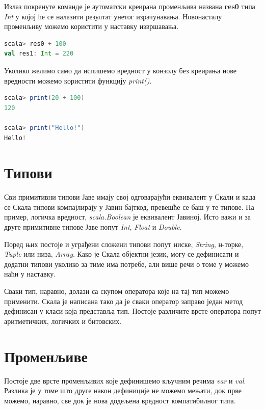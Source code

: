\documentclass[12pt,oneside]{memoir}
\begin{document}
Излаз покренуте команде је аутоматски креирана променљива названа \textbf{res0} типа \textit{Int} у којој ће се налазити резултат унетог израчунавања. Новонасталу променљиву можемо користити у наставку извршавања. \cite{scala_prog}

\begin{lstlisting}[language=Scala]
scala> res0 + 100
val res1: Int = 220
\end{lstlisting}

Уколико желимо само да испишемо вредност у конзолу без креирања нове вредности можемо користити функцију \textit{print()}.

\begin{lstlisting}[language=Scala]
scala> print(20 + 100)
120

scala> print("Hello!")
Hello!
\end{lstlisting}

\section{Типови}
\label{sec:scala_tip}

Сви примитивни типови Јаве имају свој одговарајући еквивалент у Скали и када се Скала типови компајлирају у Јавин бајткод, превешће се баш у те типове. На пример, логичка вредност, \textit{scala.Boolean} је еквивалент Јавиној. Исто важи и за друге примитивне типове Јаве попут \textit{Int}, \textit{Float} и \textit{Double}. \cite{scala_prog}

Поред њих постоје и уграђени сложени типови попут ниске, \textit{String}, н-торке, \textit{Tuple} или низа, \textit{Array}. Како је Скала објектни језик, могу се дефинисати и додатни типови уколико за тиме има потребе, али више речи о томе у можемо наћи у наставку.

Сваки тип, наравно, долази са скупом оператора које на тај тип можемо применити. Скала је написана тако да је сваки оператор заправо један метод дефинисан у класи која представља тип. Постоје различите врсте оператора попут аритметичких, логичких и битовских.

\section{Променљиве}
\label{sec:scala_prom}

Постоје две врсте променљивих које дефинишемо кључним речима \textit{var} и \textit{val}. Разлика је у томе што друге након дефиниције не можемо мењати, док прве  можемо, наравно, све док је нова додељена вредност компатибилног типа. \cite{scala_prog}
\end{document}
